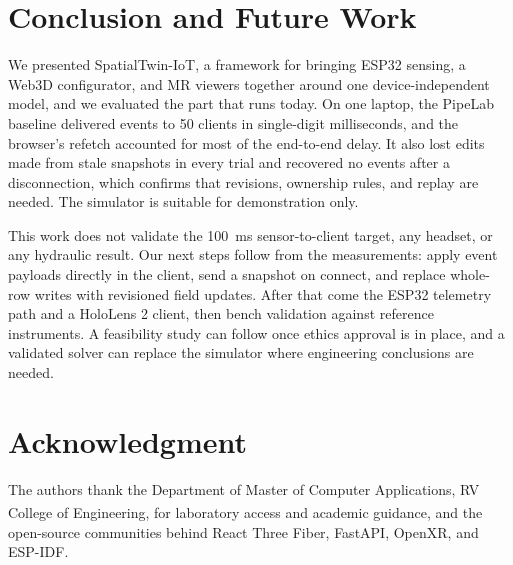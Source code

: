 \documentclass[conference]{IEEEtran}
\begin{document}
\section{Conclusion and Future Work}
We presented SpatialTwin-IoT, a framework for bringing ESP32 sensing, a Web3D configurator, and MR viewers together around one device-independent model, and we evaluated the part that runs today. On one laptop, the PipeLab baseline delivered events to 50 clients in single-digit milliseconds, and the browser's refetch accounted for most of the end-to-end delay. It also lost edits made from stale snapshots in every trial and recovered no events after a disconnection, which confirms that revisions, ownership rules, and replay are needed. The simulator is suitable for demonstration only.

This work does not validate the 100~ms sensor-to-client target, any headset, or any hydraulic result. Our next steps follow from the measurements: apply event payloads directly in the client, send a snapshot on connect, and replace whole-row writes with revisioned field updates. After that come the ESP32 telemetry path and a HoloLens 2 client, then bench validation against reference instruments. A feasibility study can follow once ethics approval is in place, and a validated solver can replace the simulator where engineering conclusions are needed.

\section*{Acknowledgment}
The authors thank the Department of Master of Computer Applications, RV College of Engineering\textsuperscript{\textregistered}, for laboratory access and academic guidance, and the open-source communities behind React Three Fiber, FastAPI, OpenXR, and ESP-IDF.
\end{document}
